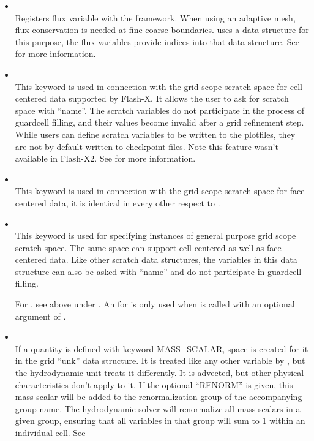 \begin{itemize}
\item {} \\ Registers flux variable
 with the framework. When using an adaptive mesh, flux
conservation is needed at fine-coarse boundaries. \Paramesh uses a data
structure for this purpose, the flux variables provide indices into that
data structure.  See  for more information.


\item {} 
\\
This keyword is used in connection with the grid scope scratch space
for cell-centered data supported by Flash-X. It allows the user to ask for scratch space with
``name''. The scratch variables do not participate in the process of
guardcell filling, and their values become invalid after a grid
refinement step. While users can define scratch variables to be
written to the plotfiles, they are not by default written to 
checkpoint files. Note this feature wasn't available in Flash-X2.
See  for more information.

\item {} 
\\
This keyword is used in connection with the grid scope scratch space
for face-centered data, it is identical in every other respect to
.

\item {} 
\\
This keyword is used for specifying instances of general purpose 
grid scope scratch space. The same space can support cell-centered as
well as face-centered data. Like other scratch data structures, the
variables in this data structure can also be asked with ``name'' and
do not participate in guardcell filling. 


For , see above under .
An  for  is only used
when  is called with an optional 
argument of .


\item {}  
 \\
If a quantity is defined with keyword MASS\_SCALAR, space is created
for it in the grid ``unk'' data structure. It is treated like any other
variable by \Paramesh, but the hydrodynamic unit treats it
differently. It is advected, but other physical characteristics don't
apply to it. If the optional ``RENORM'' is given, this mass-scalar will be
added to the renormalization group of the accompanying group name.
The hydrodynamic solver will renormalize all mass-scalars in a given group,
ensuring that all variables in that group will sum to 1 within an individual
cell.  See 


\end{itemize}
